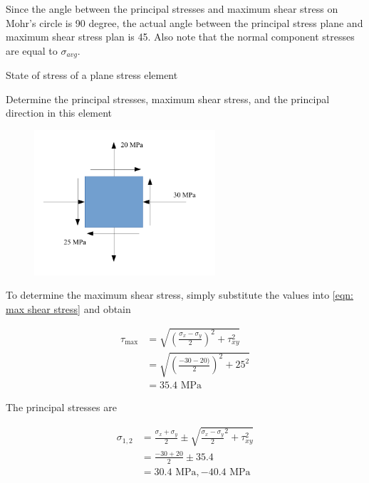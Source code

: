 \documentclass[
fontsize=10pt,
a4paper,
twosides=false,
open=any,
svgnames,
]{kaobook} %
\begin{document}
Since the angle between the principal stresses and maximum shear stress on Mohr’s circle is 90 degree, the actual angle between the principal stress plane and maximum shear stress plan is 45. Also note that the normal component stresses are equal to $\sigma_{avg}$.

\begin{example} State of stress of a plane stress element \label{example: plane stress}
  
  Determine the principal stresses, maximum shear stress, and the principal direction in this element 

  \begin{figure}[H]
    \centering
    \includegraphics[width=0.6\textwidth]{pictures/Static-body-load-analysis/plane-stress-example}
    \caption{}
  \end{figure}

  To determine the maximum shear stress, simply substitute the values into \cref{eqn: max shear stress} and obtain
  
  \begin{align*}
    \tau_{\max} &= \sqrt {\left( \frac{\sigma_x - \sigma_y}{2} \right)^2 + \tau _{xy}^2}  \\
                 &= \sqrt {\left( \frac{-30 - 20)}{2} \right)^2 + 25^2}  \\ 
                 &= 35.4 \text{ MPa} 
  \end{align*}
  
  The principal stresses are

  \begin{align*}
    \sigma_{1,2} &= \frac{\sigma_x + \sigma _y}{2} \pm \sqrt {\frac{\sigma _x - \sigma_y}{2}^2 + \tau _{xy}^2}  \\ 
                    &= \frac{-30 + 20}{2} \pm 35.4 \\ 
                    &= 30.4 \text{ MPa}, - 40.4 \text{ MPa} 
  \end{align*}
  

\end{example}
\end{document}
